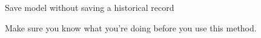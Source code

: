 \documentclass[letterpaper,10pt,english]{sphinxmanual}
\begin{document}
\begin{fulllineitems}
\begin{fulllineitems}
\label{\detokenize{masterCodeDoc:checklisten.models.Checkliste.save_without_historical_record}}
Save model without saving a historical record

Make sure you know what you’re doing before you use this method.

\end{fulllineitems}


\end{fulllineitems}

\end{document}
